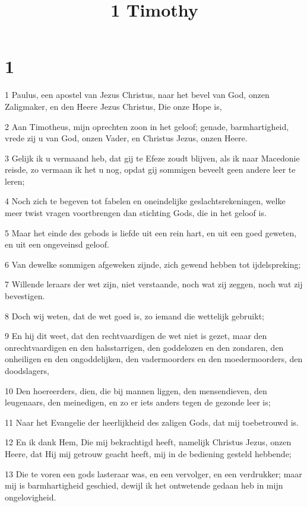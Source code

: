 

\title{1 Timothy}



\chapter{1}

\par 1 Paulus, een apostel van Jezus Christus, naar het bevel van God, onzen Zaligmaker, en den Heere Jezus Christus, Die onze Hope is,
\par 2 Aan Timotheus, mijn oprechten zoon in het geloof; genade, barmhartigheid, vrede zij u van God, onzen Vader, en Christus Jezus, onzen Heere.
\par 3 Gelijk ik u vermaand heb, dat gij te Efeze zoudt blijven, als ik naar Macedonie reisde, zo vermaan ik het u nog, opdat gij sommigen beveelt geen andere leer te leren;
\par 4 Noch zich te begeven tot fabelen en oneindelijke geslachtsrekeningen, welke meer twist vragen voortbrengen dan stichting Gods, die in het geloof is.
\par 5 Maar het einde des gebods is liefde uit een rein hart, en uit een goed geweten, en uit een ongeveinsd geloof.
\par 6 Van dewelke sommigen afgeweken zijnde, zich gewend hebben tot ijdelspreking;
\par 7 Willende leraars der wet zijn, niet verstaande, noch wat zij zeggen, noch wat zij bevestigen.
\par 8 Doch wij weten, dat de wet goed is, zo iemand die wettelijk gebruikt;
\par 9 En hij dit weet, dat den rechtvaardigen de wet niet is gezet, maar den onrechtvaardigen en den halsstarrigen, den goddelozen en den zondaren, den onheiligen en den ongoddelijken, den vadermoorders en den moedermoorders, den doodslagers,
\par 10 Den hoereerders, dien, die bij mannen liggen, den mensendieven, den leugenaars, den meinedigen, en zo er iets anders tegen de gezonde leer is;
\par 11 Naar het Evangelie der heerlijkheid des zaligen Gods, dat mij toebetrouwd is.
\par 12 En ik dank Hem, Die mij bekrachtigd heeft, namelijk Christus Jezus, onzen Heere, dat Hij mij getrouw geacht heeft, mij in de bediening gesteld hebbende;
\par 13 Die te voren een gods lasteraar was, en een vervolger, en een verdrukker; maar mij is barmhartigheid geschied, dewijl ik het ontwetende gedaan heb in mijn ongelovigheid.
